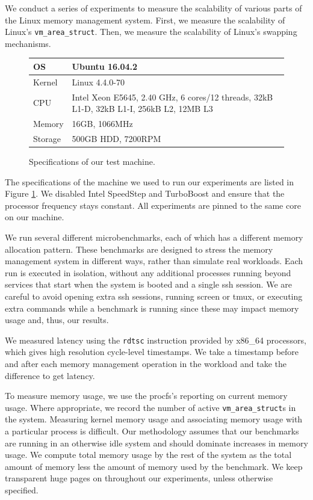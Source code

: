 \documentclass[twocolumn,11pt]{article}
\begin{document}
We conduct a series of experiments to measure the scalability of various parts
of the Linux memory management system.  First, we measure the scalability of
Linux's \texttt{vm\_area\_struct}. Then, we measure the scalability of Linux's
swapping mechanisms.

\begin{figure}[t]
\centering
\begin{tabular}{|l|p{5cm}|} \hline
OS & Ubuntu 16.04.2 \\ \hline
Kernel & Linux 4.4.0-70 \\ \hline
CPU & Intel Xeon E5645, 2.40 GHz, 6 cores/12 threads, 32kB L1-D, 32kB L1-I,
    256kB L2, 12MB L3 \\ \hline
Memory & 16GB, 1066MHz \\ \hline
Storage & 500GB HDD, 7200RPM \\
\hline
\end{tabular}
\caption{Specifications of our test machine.  \label{fig:specs}}
\end{figure}

The specifications of the machine we used to run our experiments are listed in
Figure \ref{fig:specs}. We disabled Intel SpeedStep and TurboBoost and ensure
that the processor frequency stays constant. All experiments are pinned to the
same core on our machine. 

We run several different microbenchmarks, each of which has a different memory
allocation pattern. These benchmarks are designed to stress the memory
management system in different ways, rather than simulate real workloads. 
Each run is executed in isolation, without any additional processes
running beyond services that start when the system is booted and a single ssh
session. We are careful to avoid opening extra ssh sessions, running screen or
tmux, or executing extra commands while a benchmark is running since these may
impact memory usage and, thus, our results.

We measured latency using the \texttt{rdtsc} instruction provided by x86\_64
processors, which gives high resolution cycle-level timestamps. We take a
timestamp before and after each memory management operation in the workload and
take the difference to get latency.

To measure memory usage, we use the procfs's reporting on current memory usage.
Where appropriate, we record the number of active
\texttt{vm\_area\_struct}s in the system. Measuring kernel memory usage and
associating memory usage with a particular process is difficult. Our methodology assumes
that our benchmarks are running in an otherwise idle system and should dominate
increases in memory usage.  We compute total memory usage by the rest of the
system as the total amount of memory less the amount of memory used by the
benchmark. We keep transparent huge pages on throughout our experiments, unless
otherwise specified.
\end{document}
